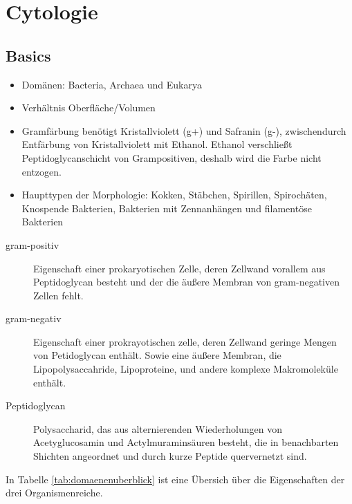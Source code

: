 \section{Cytologie}

\subsection{Basics}

	\begin{itemize}
		\item Domänen: Bacteria, Archaea und Eukarya
		\item Verhältnis Oberfläche/Volumen 
		\item Gramfärbung benötigt Kristallviolett (g+) und Safranin (g-),
			zwischendurch Entfärbung von Kristallviolett mit Ethanol.
			Ethanol verschließt Peptidoglycanschicht von Grampositiven,
			deshalb wird die Farbe nicht entzogen.
		\item Haupttypen der Morphologie: 
			Kokken,
			Stäbchen,
			Spirillen,
			Spirochäten,
			Knospende Bakterien,
			Bakterien mit Zennanhängen
			und filamentöse Bakterien
	\end{itemize}

	\begin{description}
		\item[gram-positiv]
			Eigenschaft einer prokaryotischen Zelle,
			deren Zellwand vorallem aus Peptidoglycan besteht
			und der die äußere Membran von gram-negativen Zellen fehlt.

		\item[gram-negativ] 
			Eigenschaft einer prokrayotischen zelle,
			deren Zellwand geringe Mengen von Petidoglycan enthält.
			Sowie eine äußere Membran,
			die Lipopolysaccahride,
			Lipoproteine,
			und andere komplexe Makromoleküle enthält.

		\item[Peptidoglycan]
			Polysaccharid,
			das aus alternierenden Wiederholungen von Acetyglucosamin und Actylmuraminsäuren besteht,
			die in benachbarten Shichten angeordnet
			und durch kurze Peptide quervernetzt sind.

	\end{description}

	In Tabelle \ref{tab:domaenenuberblick} ist eine Übersich über die Eigenschaften der drei Organismenreiche.	

